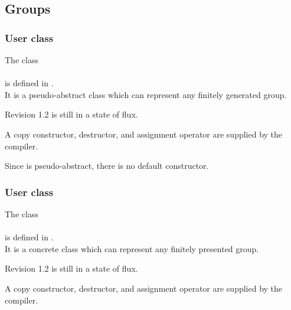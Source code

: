 

\subsection{Groups}


\subsubsection{User class }


\noindent The class\\
\\
is defined in .\\
It is a pseudo-abstract class which can represent any
finitely generated group.



\noindent Revision 1.2 is still in a state of flux.

\noindent A copy constructor, destructor, and assignment operator are
supplied by the compiler.

\noindent Since  is pseudo-abstract, there is
no default constructor.


\subsubsection{User class }


\noindent The class\\
\\
is defined in .\\
It is a concrete class which can represent any
finitely presented group.



\noindent Revision 1.2 is still in a state of flux.

\noindent A copy constructor, destructor, and assignment operator are
supplied by the compiler.



